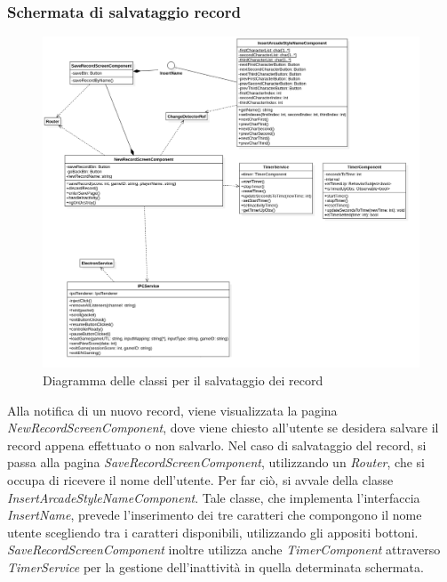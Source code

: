 \subsubsection{Schermata di salvataggio record}
\begin{figure}[h]
    \centering
    \includegraphics[width=340pt]{images/prog/NewRecord.png}
    \caption{Diagramma delle classi per il salvataggio dei record}
    \label{fig:newRecord}
\end{figure}
Alla notifica di un nuovo record, viene visualizzata la pagina \emph{NewRecordScreenComponent}, dove viene chiesto all'utente se desidera salvare il record appena effettuato o non salvarlo.
Nel caso di salvataggio del record, si passa alla pagina \emph{SaveRecordScreenComponent}, utilizzando un \emph{Router}, che si occupa di ricevere il nome dell'utente. Per far ciò, si avvale della classe \emph{InsertArcadeStyleNameComponent}.
Tale classe, che implementa l'interfaccia \emph{InsertName}, prevede l'inserimento dei tre caratteri che compongono il nome utente scegliendo tra i caratteri disponibili, utilizzando gli appositi bottoni.
\emph{SaveRecordScreenComponent} inoltre utilizza anche \emph{TimerComponent} attraverso \emph{TimerService} per la gestione dell'inattività in quella determinata schermata.
\newpage
